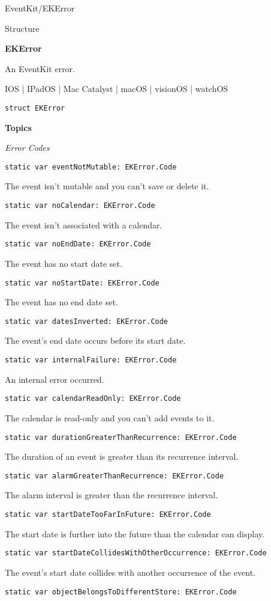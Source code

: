 \documentclass{article}
\title{}
\author{}
\date{}
\begin{document}
EventKit/EKError

Structure

\textbf{EKError}

An EventKit error.

IOS | IPadOS | Mac Catalyst | macOS | visionOS | watchOS

\texttt{struct EKError}

\textbf{Topics}

\textit{Error Codes}

\texttt{static var eventNotMutable: EKError.Code}

The event isn't mutable and you can't save or delete it.

\texttt{static var noCalendar: EKError.Code}

The event isn't associated with a calendar.

\texttt{static var noEndDate: EKError.Code}

The event has no start date set.

\texttt{static var noStartDate: EKError.Code}

The event has no end date set.

\texttt{static var datesInverted: EKError.Code}

The event's end date occurs before its start date.

\texttt{static var internalFailure: EKError.Code}

An internal error occurred.

\texttt{static var calendarReadOnly: EKError.Code}

The calendar is read-only and you can't add events to it.

\texttt{static var durationGreaterThanRecurrence: EKError.Code}

The duration of an event is greater than its recurrence interval.

\texttt{static var alarmGreaterThanRecurrence: EKError.Code}

The alarm interval is greater than the recurrence interval.

\texttt{static var startDateTooFarInFuture: EKError.Code}

The start date is further into the future than the calendar can display.

\texttt{static var startDateCollidesWithOtherOccurrence: EKError.Code}

The event's start date collides with another occurrence of the event.

\texttt{static var objectBelongsToDifferentStore: EKError.Code}
\end{document}
